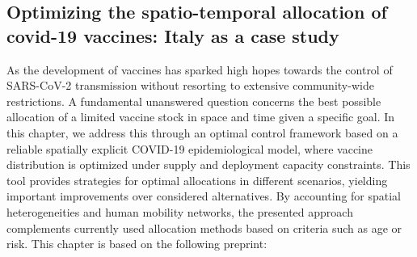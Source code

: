 \begin{fullwidth}
	\chapter[Optimizing the spatio-temporal allocation of  covid-19 vaccines: Italy as a case study]{Optimizing the spatio-temporal allocation of \\covid-19 vaccines: Italy as a case study}
\label{ch:covid-italy-ocp}

As the development of vaccines has sparked high hopes towards the control of SARS-CoV-2 transmission without resorting to extensive community-wide restrictions. A fundamental unanswered question concerns the best possible allocation of a limited vaccine stock in space and time given a specific goal. In this chapter, we address this through an optimal control framework based on a reliable spatially explicit COVID-19 epidemiological model, where vaccine distribution is optimized under supply and deployment capacity constraints. This tool provides strategies for optimal allocations in different scenarios, yielding important improvements over considered alternatives. By accounting for spatial heterogeneities and human mobility networks, the presented approach complements currently used allocation methods based on criteria such as age or risk.
This chapter is based on the following preprint:


\end{fullwidth}
